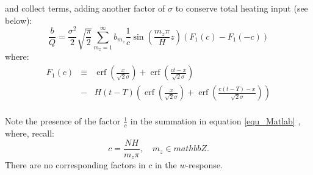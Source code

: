 \documentclass[12pt]{article}
\DeclareMathOperator\erf {erf}
\begin{document}
%
and collect terms, adding another factor of $\sigma$ to conserve total heating input (see below):
%
\begin{equation}
\frac{b}{Q}  = \frac{\sigma^2}{2} \sqrt{ \frac{\pi}{2} } \sum_{m_z = 1}^{\infty} b_{m_z} \frac{1}{ c }\sin \left( \frac{m_z \pi} {H} z\right) \left( F_1 (c) - F_1 (-c) \right) 
\end{equation}
%
where:
%
\begin{eqnarray}
F_1(c)  & \equiv & \erf \left( \frac{x}{\sqrt{2} \sigma} \right) +  \erf \left( \frac{ct-x}{\sqrt{2} \sigma} \right) \\ \nonumber
& - &  H(t-T) \left( \erf \left( \frac{x}{\sqrt{2} \sigma} \right) +  \erf \left( \frac{c(t-T)-x}{\sqrt{2} \sigma} \right)    \right) \\ \nonumber
\end{eqnarray}

Note the presence of the factor $\frac{1}{c}$ in the summation in equation \ref{equ_Matlab} , where, recall:
%
\begin{equation}
c = \frac{N H}{ m_z \pi}, \quad m_z \in mathbb{Z}.
\end{equation}
%
There are no corresponding factors in $c$ in the $w$-response. 
%
%
%
\end{document}
